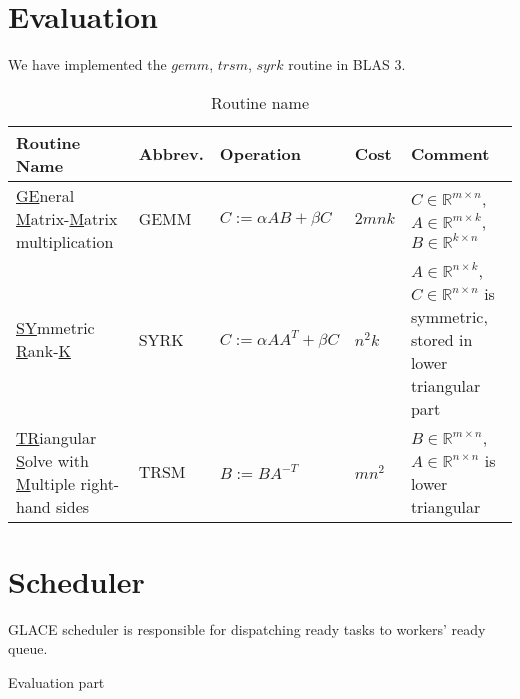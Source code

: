\documentclass[preprint,11pt]{elsarticle}
\begin{document}
 



\section{Evaluation}

We have implemented the $gemm$, $trsm$, $syrk$ routine in BLAS 3.\\

\begin{table}
  \centering
  {\footnotesize 
  \begin{tabular}{l|l|l|l|l}
    \hline
	Routine Name    & Abbrev. & Operation & Cost & Comment\\
	\hline
	\underline{GE}neral \underline{M}atrix-\underline{M}atrix multiplication & GEMM & $C:=\alpha AB+\beta C$ & $2mnk$ & $C \in \mathbb{R}^{m \times n}$, $A \in \mathbb{R}^{m \times k}$, $B \in \mathbb{R}^{k \times n}$  \\
	\hline
    \underline{SY}mmetric \underline{R}ank-\underline{K} & SYRK &  $C:=\alpha AA^{T}+\beta C$ & $n^2k$ & $A \in \mathbb{R}^{n \times k}$, $C \in \mathbb{R}^{n \times n}$ is symmetric, stored in lower triangular part\\
    \hline
	\underline{TR}iangular \underline{S}olve with \underline{M}ultiple right-hand sides & TRSM &  $B:=BA^{-T}$ & $mn^2$ & $B \in \mathbb{R}^{m \times n}$, $A \in \mathbb{R}^{n \times n}$ is lower triangular\\
	\hline
  \end{tabular}
}
\caption{Routine name}
  \label{tab:notation}
\end{table}





\section{Scheduler}
  GLACE scheduler is responsible for dispatching ready tasks to workers' ready queue. 





Evaluation part
\end{document}

